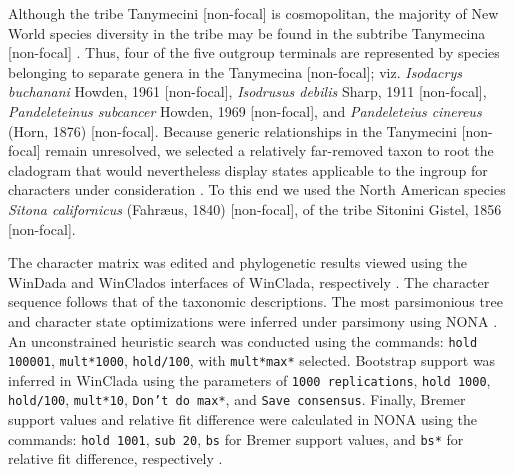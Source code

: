 \documentclass[fleqn,10pt,lineno]{wlpeerj} %
\begin{document}
		Although the tribe Tanymecini [non-focal] is cosmopolitan, the majority of New World species diversity in the tribe may be found in the subtribe Tanymecina [non-focal] \citep{alonso1999}.
		Thus, four of the five outgroup terminals are represented by species belonging to separate genera in the Tanymecina [non-focal]; viz. \textit{Isodacrys buchanani} Howden, 1961 [non-focal], \textit{Isodrusus debilis} Sharp, 1911 [non-focal], \textit{Pandeleteinus subcancer} Howden, 1969 [non-focal], and \textit{Pandeleteius cinereus} (Horn, 1876) [non-focal].
		Because generic relationships in the Tanymecini [non-focal] remain unresolved, we selected a relatively far-removed taxon to root the cladogram that would nevertheless display states applicable to the ingroup for characters under consideration \citep{rieppel2007, franz2014}.
		To this end we used the North American species \textit{Sitona californicus} (Fahr{\ae}us, 1840) [non-focal], of the tribe Sitonini Gistel, 1856 [non-focal].
		
		The character matrix was edited and phylogenetic results viewed using the WinDada and WinClados interfaces of WinClada, respectively \citep{nixon2002}.
		The character sequence follows that of the taxonomic descriptions.
		The most parsimonious tree and character state optimizations were inferred under parsimony using NONA \citep{goloboff1999}.
		An unconstrained heuristic search was conducted using the commands: \texttt{hold 100001}, \texttt{mult*1000}, \texttt{hold/100}, with \texttt{mult*max*} selected.
		Bootstrap support was inferred in WinClada using the parameters of \texttt{1000 replications}, \texttt{hold 1000}, \texttt{hold/100}, \texttt{mult*10}, \texttt{Don’t do max*}, and \texttt{Save consensus}.
		Finally, Bremer support values \citep{bremer1994} and relative fit difference \citep{goloboff2001} were calculated in NONA using the commands: \texttt{hold 1001}, \texttt{sub 20}, \texttt{bs} for Bremer support values, and \texttt{bs*} for relative fit difference, respectively \citep{goloboff2008}.
		
\end{document}
